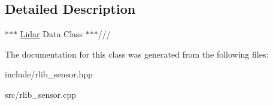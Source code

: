 \subsection{Detailed Description}
$\ast$$\ast$$\ast$ \hyperlink{classrlib_1_1Lidar}{Lidar} Data Class $\ast$$\ast$$\ast$/// 

The documentation for this class was generated from the following files\-:\begin{DoxyCompactItemize}
\item 
include/rlib\-\_\-sensor.\-hpp\item 
src/rlib\-\_\-sensor.\-cpp\end{DoxyCompactItemize}
